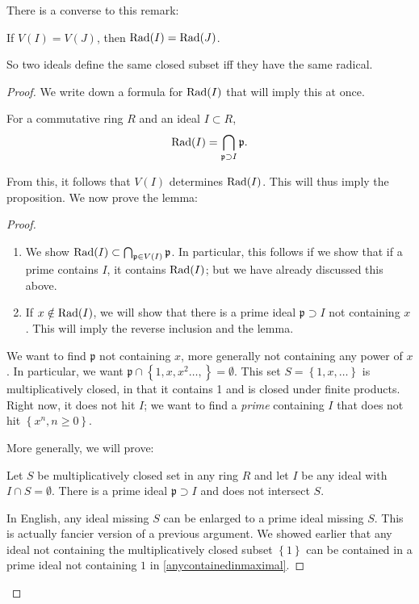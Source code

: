 There is a converse to this remark:
\begin{proposition} 
If $V(I) = V(J)$, then $\operatorname{Rad}(I) = \operatorname{Rad}(J)$. 
\end{proposition} 
So two ideals define the same closed subset iff they have the
same radical.
\begin{proof} 
We write down a formula for $\operatorname{Rad}(I)$ that will imply this at
once.
\begin{lemma} For a commutative ring $R$ and an ideal $I \subset
R$,
\[ \operatorname{Rad}(I) = \bigcap_{\mathfrak{p} \supset I} \mathfrak{p}.  \]
\end{lemma} 
From this, it follows that $V(I)$ determines $\operatorname{Rad}(I)$. This
will thus imply
the proposition.  
We now prove the lemma:
\begin{proof} 
\begin{enumerate}
\item We show $\operatorname{Rad}(I) \subset \bigcap_{\mathfrak{p} \in V(I)}
\mathfrak{p} $. In
particular, this follows if we show that if a prime contains
$I$, it contains $\operatorname{Rad}(I)$; but we have already
discussed this above.  
\item If $x \notin \operatorname{Rad}(I)$, we will show that there is a prime
ideal $\mathfrak{p}
\supset I$ not containing $x$. This will imply the reverse
inclusion and the
lemma.  
\end{enumerate}


We want to find $\mathfrak{p}$ not containing $x$, more
generally not
containing any power of $x$. In particular, we want
$\mathfrak{p} \cap \left\{1,
x, x^2 \dots, \right\} = \emptyset$. This set $S = \left\{1, x,
\dots\right\}$
is multiplicatively closed, in that it contains 1 and is closed
under
finite products. Right now, it does not hit $I$; we want to find
a
\emph{prime} containing $I$ that does not hit $\left\{x^n, n
\geq 0\right\}$.


More generally, we will prove:

\begin{sublemma}
Let $S$ be multiplicatively closed set in any ring $R$ and let
$I$ be any ideal with $I \cap S =
\emptyset$. There is a prime ideal $\mathfrak{p} \supset I$ and
does not
intersect $S$.  
\end{sublemma}
In English, any ideal missing $S$ can be enlarged to a prime
ideal missing $S$.
This is actually fancier version of a previous argument. We
showed earlier that any ideal not
containing the multiplicatively closed subset $\left\{1\right\}$
can be
contained in a prime ideal not containing $1$ in
\ref{anycontainedinmaximal}.


\end{proof}
\end{proof}
